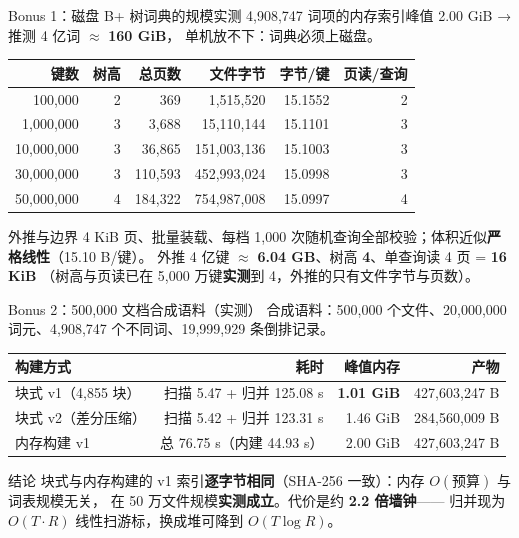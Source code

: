 \documentclass[UTF8,fontset=none,aspectratio=169,10pt]{ctexbeamer}
\newcommand{\key}[1]{\textcolor{accent}{\textbf{#1}}}
\newcommand{\bad}[1]{\textcolor{alertred}{\textbf{#1}}}
\newcommand{\src}[1]{\par\vspace{0.5em}{\fontsize{8}{9.6}\selectfont\color{gray}#1\par}}
\newcommand{\vsp}{\vspace*{\stretch{1}}}
\begin{document}
\begin{frame}{Bonus 1：磁盘 B+ 树词典的规模实测}
  \normalsize
  4,908,747 词项的内存索引峰值 2.00 GiB → 推测 4 亿词 $\approx$ \bad{160 GiB}，
  单机放不下：词典必须上磁盘。
  \vsp
  \begin{center}
  \small
  \begin{tabular}{r r r r r r}
    \toprule
    键数 & 树高 & 总页数 & 文件字节 & 字节/键 & 页读/查询 \\
    \midrule
    100,000 & 2 & 369 & 1,515,520 & 15.1552 & 2 \\
    1,000,000 & 3 & 3,688 & 15,110,144 & 15.1101 & 3 \\
    10,000,000 & 3 & 36,865 & 151,003,136 & 15.1003 & 3 \\
    30,000,000 & 3 & 110,593 & 452,993,024 & 15.0998 & 3 \\
    50,000,000 & 4 & 184,322 & 754,987,008 & 15.0997 & 4 \\
    \bottomrule
  \end{tabular}
  \end{center}
  \vsp
  \begin{block}{外推与边界}
    \small
    4 KiB 页、批量装载、每档 1,000 次随机查询全部校验；体积近似\key{严格线性}（15.10 B/键）。
    外推 4 亿键 $\approx$ \key{6.04 GB}、树高 \key{4}、单查询读 4 页 = \key{16 KiB}
    （树高与页读已在 5,000 万键\key{实测}到 4，外推的只有文件字节与页数）。
  \end{block}
\end{frame}

\begin{frame}{Bonus 2：500,000 文档合成语料（实测）}
  \normalsize
  合成语料：500,000 个文件、20,000,000 词元、4,908,747 个不同词、19,999,929 条倒排记录。
  \vsp
  \begin{center}
  \normalsize
  \begin{tabularx}{0.98\textwidth}{L r r r}
    \toprule
    构建方式 & 耗时 & 峰值内存 & 产物 \\
    \midrule
    块式 v1（4,855 块） & 扫描 5.47 + 归并 125.08 s & \key{1.01 GiB} & 427,603,247 B \\
    块式 v2（差分压缩） & 扫描 5.42 + 归并 123.31 s & 1.46 GiB & 284,560,009 B \\
    内存构建 v1 & 总 76.75 s（内建 44.93 s） & 2.00 GiB & 427,603,247 B \\
    \bottomrule
  \end{tabularx}
  \end{center}
  \vsp
  \begin{block}{结论}
    \normalsize
    块式与内存构建的 v1 索引\key{逐字节相同}（SHA-256 一致）：内存 $O(\text{预算})$ 与词表规模无关，
    在 50 万文件规模\key{实测成立}。代价是约 \bad{2.2 倍墙钟}——
    归并现为 $O(T\cdot R)$ 线性扫游标，换成堆可降到 $O(T\log R)$。
  \end{block}
\end{frame}
\end{document}
